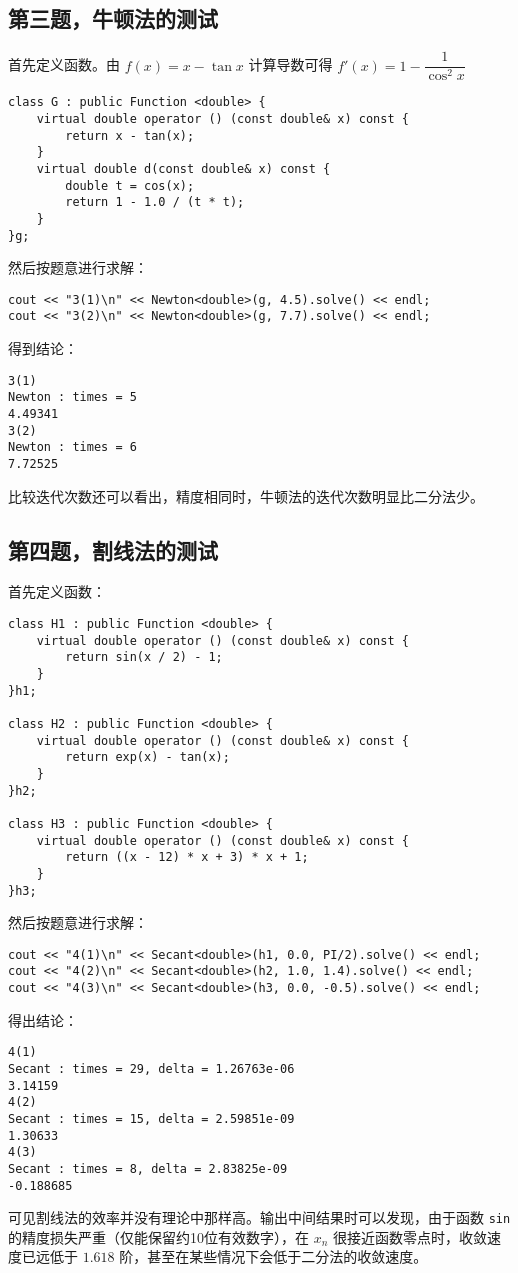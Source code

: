 \documentclass{ctexart}
\begin{document}
\subsection{第三题，牛顿法的测试}
首先定义函数。由 $f(x)=x-\tan x$ 计算导数可得 $f'(x)=1-\dfrac  1{\cos^2x}$
\begin{verbatim}
class G : public Function <double> {
    virtual double operator () (const double& x) const {
        return x - tan(x);
    }
    virtual double d(const double& x) const {
        double t = cos(x);
        return 1 - 1.0 / (t * t);
    }
}g;
\end{verbatim}

然后按题意进行求解：
\begin{verbatim}
cout << "3(1)\n" << Newton<double>(g, 4.5).solve() << endl;
cout << "3(2)\n" << Newton<double>(g, 7.7).solve() << endl;
\end{verbatim}

得到结论：
\begin{verbatim}
3(1)
Newton : times = 5
4.49341
3(2)
Newton : times = 6
7.72525
\end{verbatim}

比较迭代次数还可以看出，精度相同时，牛顿法的迭代次数明显比二分法少。

\subsection{第四题，割线法的测试}
首先定义函数：
\begin{verbatim}
class H1 : public Function <double> {
    virtual double operator () (const double& x) const {
        return sin(x / 2) - 1;
    }
}h1;

class H2 : public Function <double> {
    virtual double operator () (const double& x) const {
        return exp(x) - tan(x);
    }
}h2;

class H3 : public Function <double> {
    virtual double operator () (const double& x) const {
        return ((x - 12) * x + 3) * x + 1;
    }
}h3;
\end{verbatim}

然后按题意进行求解：
\begin{verbatim}
cout << "4(1)\n" << Secant<double>(h1, 0.0, PI/2).solve() << endl;
cout << "4(2)\n" << Secant<double>(h2, 1.0, 1.4).solve() << endl;
cout << "4(3)\n" << Secant<double>(h3, 0.0, -0.5).solve() << endl;
\end{verbatim}

得出结论：
\begin{verbatim}
4(1)
Secant : times = 29, delta = 1.26763e-06
3.14159
4(2)
Secant : times = 15, delta = 2.59851e-09
1.30633
4(3)
Secant : times = 8, delta = 2.83825e-09
-0.188685
\end{verbatim}
可见割线法的效率并没有理论中那样高。输出中间结果时可以发现，由于函数 \verb|sin| 的精度损失严重（仅能保留约10位有效数字），在 $x_n$ 很接近函数零点时，收敛速度已远低于 $1.618$ 阶，甚至在某些情况下会低于二分法的收敛速度。
\end{document}

